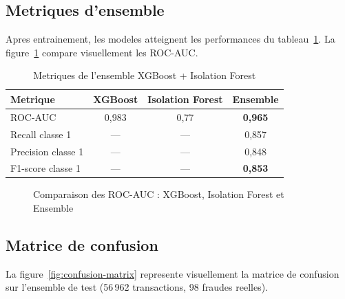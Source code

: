 \documentclass[12pt,a4paper,oneside]{report}
\begin{document}
\subsection{Metriques d'ensemble}

Apres entrainement, les modeles atteignent les performances du
tableau~\ref{tab:metriques-ml}. La figure~\ref{fig:auc-comparaison} compare
visuellement les ROC-AUC.

\begin{table}[H]
\centering
\caption{Metriques de l'ensemble XGBoost + Isolation Forest}
\label{tab:metriques-ml}
\renewcommand{\arraystretch}{1.3}
\begin{tabularx}{\textwidth}{l c c c}
\toprule
\textbf{Metrique} & \textbf{XGBoost} & \textbf{Isolation Forest} & \textbf{Ensemble} \\
\midrule
ROC-AUC                & 0,983 & 0,77  & \textbf{0,965} \\
Recall classe 1        & ---   & ---   & 0,857 \\
Precision classe 1     & ---   & ---   & 0,848 \\
F1-score classe 1      & ---   & ---   & \textbf{0,853} \\
\bottomrule
\end{tabularx}
\end{table}

\begin{figure}[H]
\centering
{}
\caption{Comparaison des ROC-AUC : XGBoost, Isolation Forest et Ensemble}
\label{fig:auc-comparaison}
\end{figure}

\subsection{Matrice de confusion}

La figure~\ref{fig:confusion-matrix} represente visuellement la matrice de
confusion sur l'ensemble de test (56\,962 transactions, 98 fraudes reelles).
\end{document}
